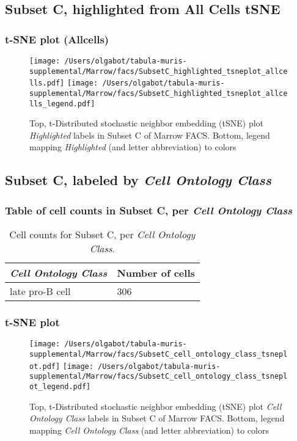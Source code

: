 \clearpage

\subsection{Subset C, highlighted from All Cells tSNE}

\subsubsection{t-SNE plot (Allcells)}
\begin{figure}[h]
\centering
\texttt{[image: /Users/olgabot/tabula-muris-supplemental/Marrow/facs/SubsetC\_highlighted\_tsneplot\_allcells.pdf]}
\texttt{[image: /Users/olgabot/tabula-muris-supplemental/Marrow/facs/SubsetC\_highlighted\_tsneplot\_allcells\_legend.pdf]}
\caption{Top, t-Distributed stochastic neighbor embedding (tSNE) plot  \emph{Highlighted} labels in Subset C of Marrow FACS. Bottom, legend mapping \emph{Highlighted} (and letter abbreviation) to colors}
\end{figure}


\clearpage

\subsection{Subset C, labeled by \emph{Cell Ontology Class}}
\subsubsection{Table of cell counts in Subset C, per \emph{Cell Ontology Class}}\begin{table}[h]
\centering
\label{my-label}
\begin{tabular}{@{}ll@{}}
\toprule

\emph{Cell Ontology Class}& Number of cells \\ \midrule
late pro-B cell & 306 \\
\bottomrule
\end{tabular}
\caption{Cell counts for Subset C, per \emph{Cell Ontology Class}.}
\end{table}

\clearpage
\subsubsection{t-SNE plot}
\begin{figure}[h]
\centering
\texttt{[image: /Users/olgabot/tabula-muris-supplemental/Marrow/facs/SubsetC\_cell\_ontology\_class\_tsneplot.pdf]}
\texttt{[image: /Users/olgabot/tabula-muris-supplemental/Marrow/facs/SubsetC\_cell\_ontology\_class\_tsneplot\_legend.pdf]}
\caption{Top, t-Distributed stochastic neighbor embedding (tSNE) plot  \emph{Cell Ontology Class} labels in Subset C of Marrow FACS. Bottom, legend mapping \emph{Cell Ontology Class} (and letter abbreviation) to colors}
\end{figure}


